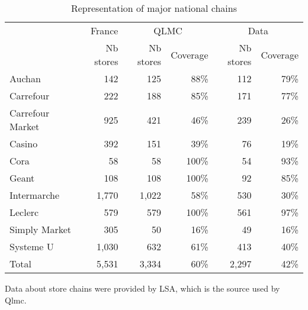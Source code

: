 \documentclass[english]{article}
\begin{document}
\begin{table}[H]
\begin{threeparttable}
\renewcommand{\arraystretch}{0.7}%
\caption{Representation of major national chains}\label{tab:qlmc_chain_repr}
\small
\begin{tabular}{lr|rr|rr}
\toprule
          & France & \multicolumn{2}{c|}{QLMC} & \multicolumn{2}{c}{Data} \\
          & Nb stores & Nb stores & Coverage & Nb stores & Coverage \\
\midrule
    Auchan & 142   & 125   & 88\%  & 112   & 79\% \\
    Carrefour & 222   & 188   & 85\%  & 171   & 77\% \\
    Carrefour Market & 925   & 421   & 46\%  & 239   & 26\% \\
    Casino & 392   & 151   & 39\%  & 76    & 19\% \\
    Cora  & 58    & 58    & 100\% & 54    & 93\% \\
    Geant & 108   & 108   & 100\% & 92    & 85\% \\
    Intermarche & 1,770 & 1,022 & 58\%  & 530   & 30\% \\
    Leclerc & 579   & 579   & 100\% & 561   & 97\% \\
    Simply Market & 305   & 50    & 16\%  & 49    & 16\% \\
    Systeme U & 1,030 & 632   & 61\%  & 413   & 40\% \\
\midrule		
    Total & 5,531 & 3,334 & 60\%  & 2,297 & 42\% \\
\bottomrule
\bottomrule
\end{tabular}
\begin{tablenotes}
      \small
      \item Data about store chains were provided by LSA, which is the source used by Qlmc.
\end{tablenotes}
\end{threeparttable}
\end{table}
\end{document}

